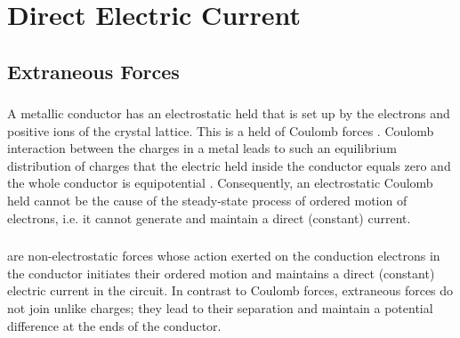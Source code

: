 





\chapter{Direct Electric Current}
\label{ch-21}

\section{Extraneous Forces}
\label{sec-21.1}

\subsection{}\label{21.1.1} 
 A metallic conductor has an electrostatic held that is set up by the electrons and positive ions of the crystal lattice. This is a held of Coulomb forces . Coulomb interaction between the charges in a metal leads to such an equilibrium distribution of charges that the electric held inside the conductor equals zero and the whole conductor is equipotential . Consequently, an electrostatic Coulomb held cannot be the cause of the steady-state process of ordered motion of electrons, i.e. it cannot generate and maintain a direct (constant) current. 
 
\subsection{}\label{21.1.2}  are non-electrostatic forces whose action exerted on the conduction electrons in the conductor initiates their ordered motion and maintains a direct (constant) electric current in the circuit. In contrast to Coulomb forces, extraneous forces do not join unlike charges; they lead to their separation and maintain a potential difference at the ends of the conductor.

